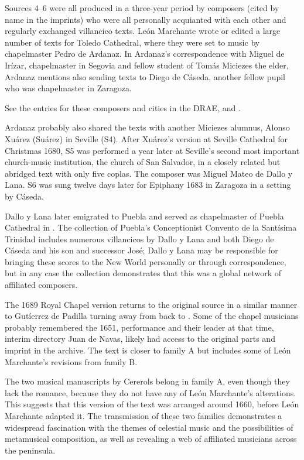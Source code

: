 Sources 4--6 were all produced in a three-year period by composers (cited by
name in the imprints) who were all personally acquianted with each other and
regularly exchanged villancico texts.
León Marchante wrote or edited a large number of texts for Toledo Cathedral,
where they were set to music by chapelmaster Pedro de Ardanaz.
In Ardanaz's correspondence with Miguel de Irízar, chapelmaster in Segovia and
fellow student of Tomás Miciezes the elder, Ardanaz mentions also sending texts
to Diego de Cáseda, another fellow pupil who was chapelmaster in Zaragoza.%
\begin{Footnote}
    See the entries for these composers and cities in the DRAE, and
    \autocite[ch. 5]{Cashner:PhD}.
\end{Footnote}
Ardanaz probably also shared the texts with another Miciezes alumnus, Alonso
Xuárez (Suárez) in Seville (S4).
After Xuárez's version at Seville Cathedral for Christmas 1680, S5 was performed
a year later at Seville's second most important church-music institution, the
church of San Salvador, in a closely related but abridged text with only five
coplas.
The composer was Miguel Mateo de Dallo y Lana.
S6 was sung twelve days later for Epiphany 1683 in Zaragoza in a setting by
Cáseda.

Dallo y Lana later emigrated to Puebla and served as chapelmaster of Puebla
Cathedral in \XXX[years].%
The collection of Puebla's Conceptionist Convento de la Santísima Trinidad
includes numerous villancicos by Dallo y Lana and both Diego de Cáseda and his
son and successor José; Dallo y Lana may be responsible for bringing these
scores to the New World personally or through correspondence, but in any case
the collection demonstrates that this was a global network of affiliated
composers.%

The 1689 Royal Chapel version returns to the original source in a similar manner
to Gutíerrez de Padilla turning away from  back to
.
Some of the chapel musicians probably remembered the 1651, performance and their
leader at that time, interim directory Juan de Navas, likely had access to the
original parts and imprint in the archive.%
The text is closer to family A but includes some of León Marchante's
revisions from family B.

The two musical manuscripts by Cererols belong in family A, even though they
lack the romance, because they do not have any of León Marchante's
alterations.
This suggests that this version of the text was arranged around 1660, before
León Marchante adapted it.
The transmission of these two families demonstrates a widespread fascination
with the themes of celestial music and the possibilities of metamusical
composition, as well as revealing a web of affiliated musicians across the
peninsula.

